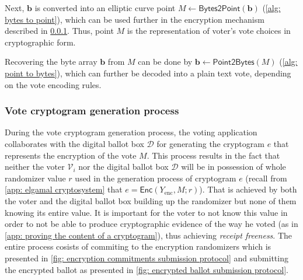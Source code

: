 Next, $\boldsymbol{b}$ is converted into an elliptic curve point $M \gets \mathsf{Bytes2Point}(\boldsymbol{b})$ (\cref{alg: bytes to point}), which can be used further in the encryption mechanism described in \cref{sec: vote cryptogram generation process}. Thus, point $M$ is the representation of voter's vote choices in cryptographic form.

Recovering the byte array $\boldsymbol{b}$ from $M$ can be done by $\boldsymbol{b} \gets \mathsf{Point2Bytes}(M)$ (\cref{alg: point to bytes}), which can further be decoded into a plain text vote, depending on the vote encoding rules.


\subsubsection{Vote cryptogram generation process} \label{sec: vote cryptogram generation process}
During the vote cryptogram generation process, the voting application collaborates with the digital ballot box $\mathcal{D}$ for generating the cryptogram $e$ that represents the encryption of the vote $M$. This process results in the fact that neither the voter $\mathcal{V}_i$ nor the digital ballot box $\mathcal{D}$ will be in possession of whole randomizer value $r$ used in the generation process of cryptogram $e$ (recall from \cref{app: elgamal cryptosystem} that $e = \mathsf{Enc}(Y_\mathrm{enc}, M; r)$). That is achieved by both the voter and the digital ballot box building up the randomizer but none of them knowing its entire value. It is important for the voter to not know this value in order to not be able to produce cryptographic evidence of the way he voted (as in \cref{app: proving the content of a cryptogram}), thus achieving \textit{receipt freeness}. The entire process cosists of commiting to the encryption randomizers which is presented in \cref{fig: encryption commitments submission protocol} and submitting the encrypted ballot as presented in \cref{fig: encrypted ballot submission protocol}.

